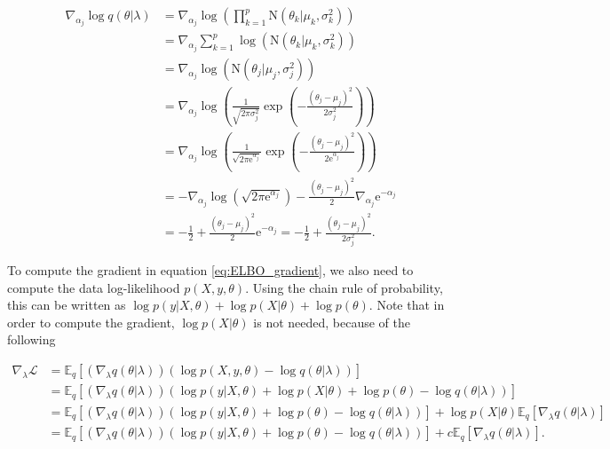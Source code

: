 \begin{equation*}
  \begin{split}
      \nabla_{\alpha_j} \log q(\theta | \lambda) & =
      \nabla_{\alpha_j} \log \left( \prod_{ k = 1}^p \mathrm{N} \left( \theta_k | \mu_k, \sigma_k^2 \right) \right) \\
      &= \nabla_{\alpha_j} \sum_{ k = 1}^p \log \left( \mathrm{N} \left( \theta_k | \mu_k, \sigma_k^2 \right) \right) \\
      &= \nabla_{\alpha_j} \log \left( \mathrm{N} \left( \theta_j | \mu_j, \sigma_j^2 \right) \right) \\
      &= \nabla_{\alpha_j} \log \left( \frac{1}{\sqrt{2 \pi \sigma_j^2}} \exp \left( -\frac{(\theta_j - \mu_j)^2}{2 \sigma_j^2} \right) \right) \\
      &= \nabla_{\alpha_j} \log \left( \frac{1}{\sqrt{2 \pi \mathrm{e}^{\alpha_j}}} \exp \left( -\frac{(\theta_j - \mu_j)^2}{2 \mathrm{e}^{\alpha_j}} \right) \right) \\
      &= - \nabla_{\alpha_j} \log \left( \sqrt{2 \pi \mathrm{e}^{\alpha_j}} \right) - \frac{(\theta_j - \mu_j)^2}{2} \nabla_{\alpha_j} \mathrm{e}^{-\alpha_j}\\
      &= - \frac{1}{2} + \frac{(\theta_j - \mu_j)^2}{2} \mathrm{e}^{-\alpha_j} =
      - \frac{1}{2} + \frac{(\theta_j - \mu_j)^2}{2 \sigma_j^2}.
  \end{split}
\end{equation*}

To compute the gradient in equation \ref{eq:ELBO_gradient}, we also need to compute the data log-likelihood $p(X, y, \theta)$. Using the chain rule of probability, this can be written as $\log p(y | X, \theta) + \log p(X | \theta) + \log p(\theta)$. Note that in order to compute the gradient, $\log p(X | \theta)$ is not needed, because of the following

\begin{equation*}
  \begin{split}
      \nabla_{\lambda} \mathcal{L} &=
      \mathbb{E}_q \left[ \left( \nabla_{\lambda} q(\theta | \lambda) \right) \left( \log p(X, y, \theta) - \log q(\theta | \lambda) \right) \right] \\
      &= \mathbb{E}_q \left[ \left( \nabla_{\lambda} q(\theta | \lambda) \right) \left( \log p(y | X, \theta) + \log p(X | \theta) + \log p(\theta) - \log q(\theta | \lambda) \right) \right] \\
      &= \mathbb{E}_q \left[ \left( \nabla_{\lambda} q(\theta | \lambda) \right) \left( \log p(y | X, \theta) + \log p(\theta) - \log q(\theta | \lambda) \right) \right] +  \log p(X | \theta) \mathbb{E}_q \left[ \nabla_{\lambda} q(\theta | \lambda) \right] \\
      &= \mathbb{E}_q \left[ \left( \nabla_{\lambda} q(\theta | \lambda) \right) \left( \log p(y | X, \theta) + \log p(\theta) - \log q(\theta | \lambda) \right) \right] +  c \mathbb{E}_q \left[ \nabla_{\lambda} q(\theta | \lambda) \right].
  \end{split}
\end{equation*}

